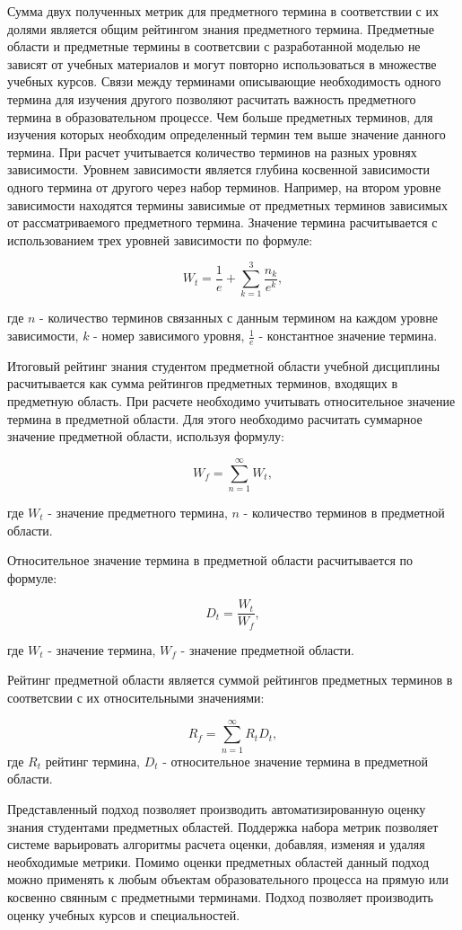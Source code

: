 Сумма двух полученных метрик для предметного термина в соответствии с их долями является общим рейтингом знания предметного термина. Предметные области и предметные термины в соответсвии с разработанной моделью не зависят от учебных материалов и могут повторно использоваться в множестве учебных курсов. Связи между терминами описывающие необходимость одного термина для изучения другого позволяют расчитать важность предметного термина в образовательном процессе. Чем больше предметных терминов, для изучения которых необходим определенный термин тем выше значение данного термина. При расчет учитывается количество терминов на разных уровнях зависимости. Уровнем зависимости является глубина косвенной зависимости одного термина от другого через набор терминов. Например, на втором уровне зависимости находятся термины зависимые от предметных терминов зависимых от рассматриваемого предметного термина. Значение термина расчитывается с использованием трех уровней зависимости по формуле: 

$$
    W_t = \frac{1}{e}+\sum_{k=1}^{3}\frac{n_k}{e^k}, 
$$

где \(n\) - количество терминов связанных с данным термином на каждом уровне зависимости, \(k\) - номер зависимого уровня, \( \frac{1}{e} \) - константное значение термина. 

Итоговый рейтинг знания студентом предметной области учебной дисциплины расчитывается как сумма рейтингов предметных терминов, входящих в предметную область. При расчете необходимо учитывать относительное значение термина в предметной области. Для этого необходимо расчитать суммарное значение предметной области, используя формулу:

$$  
    W_f = \sum_{n=1}^{\infty}W_t,
$$

где \(W_t\) - значение предметного термина, \(n\) - количество терминов в предметной области.

Относительное значение термина в предметной области расчитывается по формуле:

$$
    D_t = \frac{W_t}{W_f},
$$

где \(W_t\) - значение термина, \(W_f\) - значение предметной области.

Рейтинг предметной области является суммой рейтингов предметных терминов в соответсвии с их относительными значениями:

$$
    R_f = \sum_{n=1}^{\infty} R_tD_t,
$$
где \(R_t\) рейтинг термина, \(D_t\) - относительное значение термина в предметной области.

Представленный подход позволяет производить автоматизированную оценку знания студентами предметных областей. Поддержка набора метрик позволяет системе варьировать алгоритмы расчета оценки, добавляя, изменяя и удаляя необходимые метрики. Помимо оценки предметных областей данный подход можно применять к любым объектам образовательного процесса на прямую или косвенно свянным с предметными терминами. Подход позволяет производить оценку учебных курсов и специальностей.  

